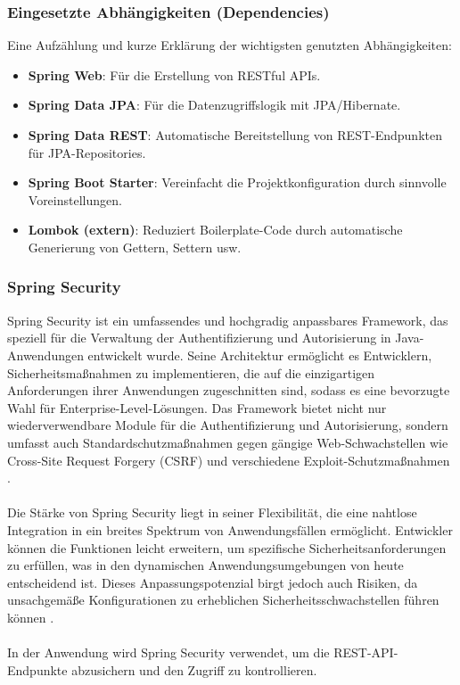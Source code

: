 \subsubsection{Eingesetzte Abhängigkeiten (Dependencies)}
Eine Aufzählung und kurze Erklärung der wichtigsten genutzten Abhängigkeiten:
\begin{itemize}
	\item \textbf{Spring Web}: Für die Erstellung von RESTful APIs.
	\item \textbf{Spring Data JPA}: Für die Datenzugriffslogik mit JPA/Hibernate.
	\item \textbf{Spring Data REST}: Automatische Bereitstellung von REST-Endpunkten für JPA-Repositories.
	\item \textbf{Spring Boot Starter}: Vereinfacht die Projektkonfiguration durch sinnvolle Voreinstellungen.
	\item \textbf{Lombok (extern)}: Reduziert Boilerplate-Code durch automatische Generierung von Gettern, Settern usw.
\end{itemize}

\subsubsection{Spring Security}

Spring Security ist ein umfassendes und hochgradig anpassbares Framework, das speziell für die Verwaltung der Authentifizierung und Autorisierung in Java-Anwendungen entwickelt wurde. Seine Architektur ermöglicht es Entwicklern, Sicherheitsmaßnahmen zu implementieren, die auf die einzigartigen Anforderungen ihrer Anwendungen zugeschnitten sind, sodass es eine bevorzugte Wahl für Enterprise-Level-Lösungen. Das Framework bietet nicht nur wiederverwendbare Module für die Authentifizierung und Autorisierung, sondern umfasst auch Standardschutzmaßnahmen gegen gängige Web-Schwachstellen wie Cross-Site Request Forgery (CSRF) und verschiedene Exploit-Schutzmaßnahmen \cite{Spring-Security:2020}. \\ \\
Die Stärke von Spring Security liegt in seiner Flexibilität, die eine nahtlose Integration in ein breites Spektrum von Anwendungsfällen ermöglicht. Entwickler können die Funktionen leicht erweitern, um spezifische Sicherheitsanforderungen zu erfüllen, was in den dynamischen Anwendungsumgebungen von heute entscheidend ist. Dieses Anpassungspotenzial birgt jedoch auch Risiken, da unsachgemäße Konfigurationen zu erheblichen Sicherheitsschwachstellen führen können \cite{Spring-Security:2020}.\\ \\
In der Anwendung wird Spring Security verwendet, um die REST-API-Endpunkte abzusichern und den Zugriff zu kontrollieren.

